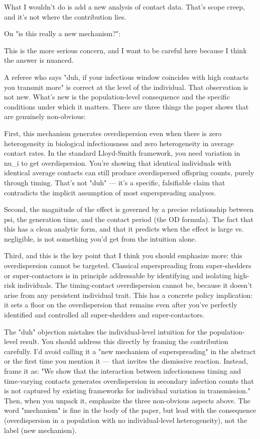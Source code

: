 {{  What I wouldn't do is add a new analysis of contact data. That's scope creep, and it's not where
  the contribution lies.

  On "is this really a new mechanism?":

  This is the more serious concern, and I want to be careful here because I think the answer is
  nuanced.

  A referee who says "duh, if your infectious window coincides with high contacts you transmit more"
  is correct at the level of the individual. That observation is not new. What's new is the
  population-level consequence and the specific conditions under which it matters. There are three
  things the paper shows that are genuinely non-obvious:

  First, this mechanism generates overdispersion even when there is zero heterogeneity in biological
  infectiousness and zero heterogeneity in average contact rates. In the standard Lloyd-Smith
  framework, you need variation in nu_i to get overdispersion. You're showing that identical
  individuals with identical average contacts can still produce overdispersed offspring counts,
  purely through timing. That's not "duh" --- it's a specific, falsifiable claim that contradicts the
   implicit assumption of most superspreading analyses.

  Second, the magnitude of the effect is governed by a precise relationship between psi, the
  generation time, and the contact period (the OD formula). The fact that this has a clean analytic
  form, and that it predicts when the effect is large vs. negligible, is not something you'd get from
   the intuition alone.

  Third, and this is the key point that I think you should emphasize more: this overdispersion cannot
   be targeted. Classical superspreading from super-shedders or super-contactors is in principle
  addressable by identifying and isolating high-risk individuals. The timing-contact overdispersion
  cannot be, because it doesn't arise from any persistent individual trait. This has a concrete
  policy implication: it sets a floor on the overdispersion that remains even after you've perfectly
  identified and controlled all super-shedders and super-contactors.

  The "duh" objection mistakes the individual-level intuition for the population-level result. You
  should address this directly by framing the contribution carefully. I'd avoid calling it a "new
  mechanism of superspreading" in the abstract or the first time you mention it --- that invites the
  dismissive reaction. Instead, frame it as: "We show that the interaction between infectiousness
  timing and time-varying contacts generates overdispersion in secondary infection counts that is not
   captured by existing frameworks for individual variation in transmission." Then, when you unpack
  it, emphasize the three non-obvious aspects above. The word "mechanism" is fine in the body of the
  paper, but lead with the consequence (overdispersion in a population with no individual-level
  heterogeneity), not the label (new mechanism).

}}
